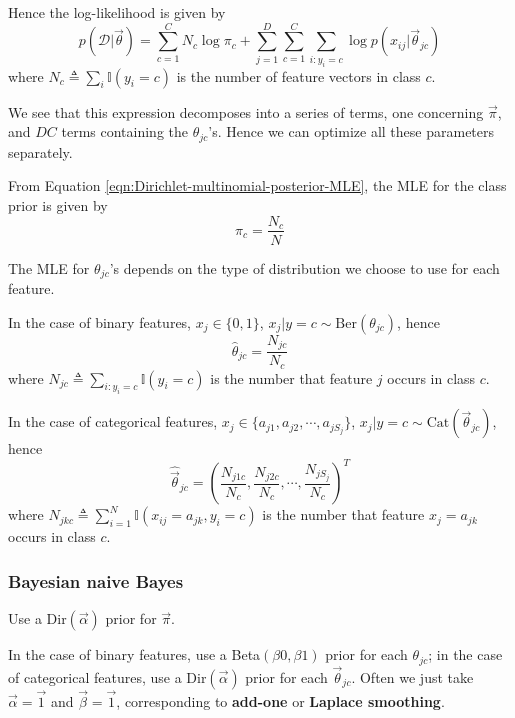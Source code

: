 \begin{refsection}
Hence the log-likelihood is given by
\begin{equation}
p(\mathcal{D}|\vec{\theta})=\sum\limits_{c=1}^C{N_c\log\pi_c}+ \sum\limits_{j=1}^D{\sum\limits_{c=1}^C{\sum\limits_{i:y_i=c}{\log p(x_{ij}|\vec{\theta}_{jc})}}}
\end{equation}
where $N_c \triangleq \sum\limits_i \mathbb{I}(y_i=c)$ is the number of feature vectors in class $c$.

We see that this expression decomposes into a series of terms, one concerning $\vec{\pi}$, and $DC$ terms containing the $\theta_{jc}$’s. Hence we can optimize all these parameters separately.

From Equation \ref{eqn:Dirichlet-multinomial-posterior-MLE}, the MLE for the class prior is given by
\begin{equation}
\hat{\pi}_c=\dfrac{N_c}{N}
\end{equation}

The MLE for $\theta_{jc}$’s depends on the type of distribution we choose to use for each feature. 

In the case of binary features, $x_j \in \{0,1\}$, $x_j|y=c \sim \text{Ber}(\theta_{jc})$, hence
\begin{equation}
\hat{\theta}_{jc}=\dfrac{N_{jc}}{N_c}
\end{equation}
where $N_{jc} \triangleq \sum\limits_{i:y_i=c} \mathbb{I}(y_i=c)$ is the number that feature $j$ occurs in class $c$.

In the case of categorical features, $x_j \in \{a_{j1},a_{j2},\cdots, a_{jS_j}\}$, $x_j|y=c \sim \text{Cat}(\vec{\theta}_{jc})$, hence
\begin{equation}
\hat{\vec{\theta}}_{jc}=(\dfrac{N_{j1c}}{N_c},\dfrac{N_{j2c}}{N_c}, \cdots, \dfrac{N_{jS_j}}{N_c})^T
\end{equation}
where $N_{jkc} \triangleq \sum\limits_{i=1}^N \mathbb{I}(x_{ij}=a_{jk}, y_i=c)$ is the number that feature $x_j=a_{jk}$ occurs in class $c$.


\subsubsection{Bayesian naive Bayes}
\label{sec:Bayesian-naive-Bayes}
Use a Dir$(\vec{\alpha})$ prior for $\vec{\pi}$.

In the case of binary features, use a Beta$(\beta0,\beta1)$ prior for each $\theta_{jc}$; in the case of categorical features, use a Dir$(\vec{\alpha})$ prior for each  $\vec{\theta}_{jc}$. Often we just take $\vec{\alpha}=\vec{1}$ and $\vec{\beta}=\vec{1}$, corresponding to \textbf{add-one} or \textbf{Laplace smoothing}.



\end{refsection}
